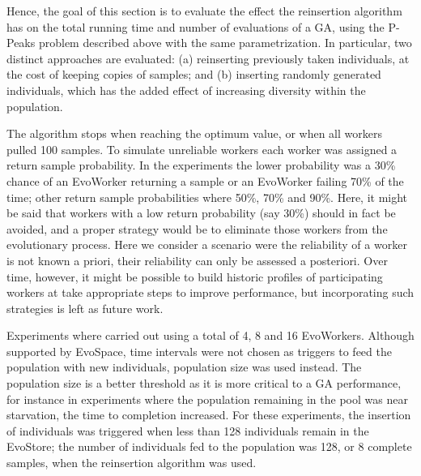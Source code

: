 Hence, the goal of this section is to evaluate the effect the reinsertion algorithm has on the total
running time and number of evaluations of a GA, using the P-Peaks problem described above with the same parametrization.
In particular, two distinct approaches are evaluated: (a) reinserting previously taken individuals, at the cost of keeping copies of
samples; and (b) inserting randomly generated individuals, which has the added effect of increasing diversity within the population.

The algorithm stops when reaching the optimum value, or when all workers
pulled 100 samples. To simulate unreliable workers each worker was assigned a
return sample probability. In the experiments the lower probability was a 30\%
chance of an EvoWorker returning a sample or an EvoWorker failing 70\% of the
time; other return sample probabilities where 50\%, 70\% and 90\%.
Here, it might be said that workers with a low return probability (say 30\%) should in fact be avoided,
and a proper strategy would be to eliminate those workers from the evolutionary process.
Here we consider a scenario were the reliability of a worker is not known a priori, their reliability can only be assessed a posteriori.
Over time, however, it might be possible to build historic profiles of participating workers at take appropriate steps to improve performance,
but incorporating such strategies is left as future work.

Experiments where carried out using a total of 4, 8 and 16 EvoWorkers.
Although supported by EvoSpace, time intervals were not chosen as triggers
to feed the population with new individuals, population size was used instead.
The population size is a better threshold as it is more critical
to a GA performance, for instance in experiments where the population remaining in the pool was near starvation, the time to completion increased.
For these experiments, the insertion of individuals was triggered when less than
128 individuals remain in the EvoStore; the number of individuals fed to the
population was 128, or 8 complete samples, when the reinsertion algorithm was used.


